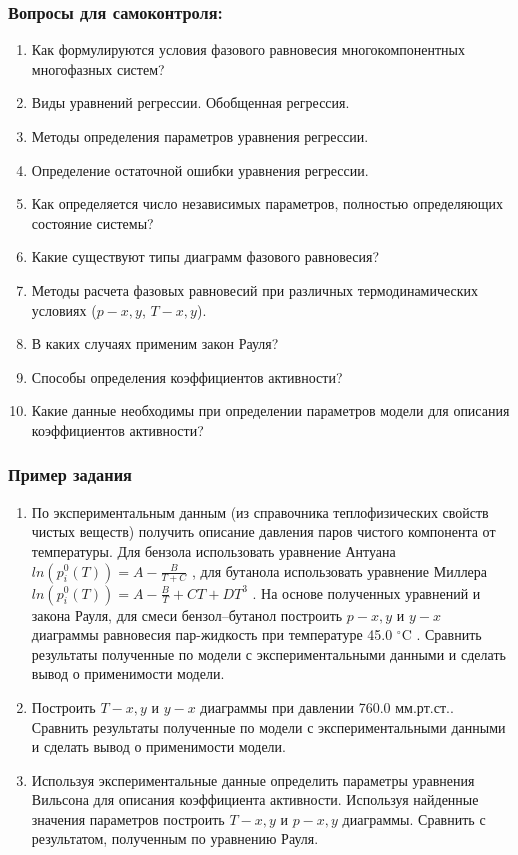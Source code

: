\subsubsection*{Вопросы для самоконтроля:}
\begin{enumerate}
	\item Как формулируются условия фазового равновесия многокомпонентных многофазных систем?
	\item Виды уравнений регрессии. Обобщенная регрессия.
	\item Методы определения параметров уравнения регрессии.
	\item Определение остаточной ошибки уравнения регрессии.
	\item Как определяется число независимых параметров, полностью определяющих состояние системы?
	\item Какие существуют типы диаграмм фазового равновесия?
	\item Методы расчета фазовых равновесий при различных термодинамических условиях ($p-x,y$,  $T-x,y$).
	\item В каких случаях применим закон Рауля?
	\item Способы определения коэффициентов активности?
	\item Какие данные необходимы при определении параметров модели для описания коэффициентов активности?
\end{enumerate}

\subsubsection*{Пример задания}
\begin{enumerate}
	\item По экспериментальным данным (из справочника теплофизических свойств чистых веществ) получить описание давления паров чистого компонента от температуры. Для бензола использовать уравнение Антуана $ln(p_i^0(T))=A-\frac{B}{T+C}$         , для бутанола использовать уравнение Миллера $ln(p_i^0(T))=A-\frac{B}{T}+C T+DT^3$  . На основе полученных уравнений и закона Рауля, для смеси бензол--бутанол построить $p-x,y$ и $y-x$ диаграммы равновесия пар-жидкость при температуре   45.0 $^\circ$C . Сравнить результаты полученные по модели с экспериментальными данными и сделать вывод о применимости модели.
	
	\item Построить $T-x,y$ и $y-x$ диаграммы при давлении  760.0 мм.рт.ст.. Сравнить результаты полученные по модели с экспериментальными данными \cite{kogan1,kogan2} и сделать вывод о применимости модели. 
	
	\item Используя экспериментальные данные определить параметры уравнения Вильсона для описания коэффициента активности. Используя найденные значения параметров построить $T-x,y$ и $p-x,y$ диаграммы. Сравнить с результатом, полученным по уравнению Рауля.\end{enumerate}
